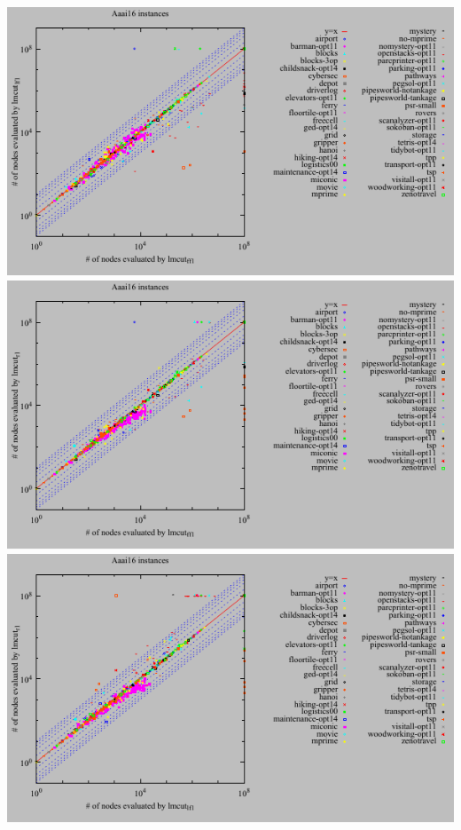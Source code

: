 \includegraphics{tables/aaai16-evaluated-lmcut_ff-lmcut_lf.pdf}
\linebreak
\includegraphics{tables/aaai16-evaluated-lmcut_ff-lmcut_r.pdf}
\linebreak
\includegraphics{tables/aaai16-evaluated-lmcut_lf-lmcut_r.pdf}
\linebreak
